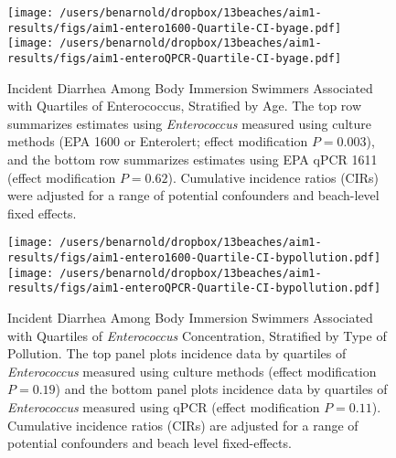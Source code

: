 \documentclass[12pt]{article}\usepackage[]{graphicx}\usepackage[]{color}
\begin{document}
\begin{landscape}
\begin{figure}
\begin{center}
\texttt{[image: /users/benarnold/dropbox/13beaches/aim1-results/figs/aim1-entero1600-Quartile-CI-byage.pdf]} \\
\texttt{[image: /users/benarnold/dropbox/13beaches/aim1-results/figs/aim1-enteroQPCR-Quartile-CI-byage.pdf]}
\caption{Incident Diarrhea Among Body Immersion Swimmers Associated with Quartiles of Enterococcus, Stratified by Age. The top row summarizes estimates using \textit{Enterococcus} measured using culture methods (EPA 1600 or Enterolert; effect modification $P=0.003$), and the bottom row summarizes estimates using EPA qPCR 1611 (effect modification $P=0.62$).  Cumulative incidence ratios (CIRs) were adjusted for a range of potential confounders and beach-level fixed effects.   \label{fig:Qenteroage}}
\end{center}
\end{figure}
\end{landscape}

\begin{figure}
\begin{center}
\texttt{[image: /users/benarnold/dropbox/13beaches/aim1-results/figs/aim1-entero1600-Quartile-CI-bypollution.pdf]} \\
\texttt{[image: /users/benarnold/dropbox/13beaches/aim1-results/figs/aim1-enteroQPCR-Quartile-CI-bypollution.pdf]}
\caption{Incident Diarrhea Among Body Immersion Swimmers Associated with Quartiles of \textit{Enterococcus} Concentration, Stratified by Type of Pollution. The top panel plots incidence data by quartiles of \textit{Enterococcus} measured using culture methods (effect modification $P=0.19$) and the bottom panel plots incidence data by quartiles of \textit{Enterococcus} measured using qPCR (effect modification $P=0.11$).  Cumulative incidence ratios (CIRs) are adjusted for a range of potential confounders and beach level fixed-effects.   \label{fig:Qenteropol}}
\end{center}
\end{figure}
\end{document}
